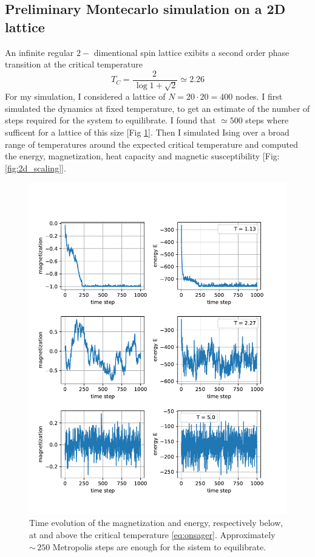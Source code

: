 {\subsection*{Preliminary Montecarlo simulation on a 2D lattice}
{\small
An infinite regular $2-$ dimentional spin lattice exibits a second order phase transition at the critical temperature 
\begin{equation}
T_C = \frac{2\,}{\,\log{1 + \sqrt{2}}} \simeq 2.26
  \end{equation}  
    \label{eq:onsager}
For my simulation, I considered a lattice of $N = 20 \cdot 20 = 400$ nodes. I first simulated the dynamics at fixed temperature, to get an estimate of the number of steps required for the system to equilibrate. I found that $\simeq 500$ steps where sufficent for a lattice of this size [Fig \ref{fig:2d_relaxation}]. Then I simulated Ising over a broad range of temperatures around the expected critical temperature and computed the energy, magnetization, heat capacity and magnetic susceptibility [Fig: \ref{fig:2d_scaling}].
}
\begin{figure}[H]
    \centering
    \includegraphics[width=0.8\linewidth]{latex_source/images/ising/2d_relaxation.pdf}
    \caption{{\small Time evolution of the magnetization and energy, respectively below, at and above the critical temperature \ref{eq:onsager}. Approximately $\sim\,250$ Metropolis steps are enough for the sistem to equilibrate.}}
    \label{fig:2d_relaxation}
\end{figure}

}
